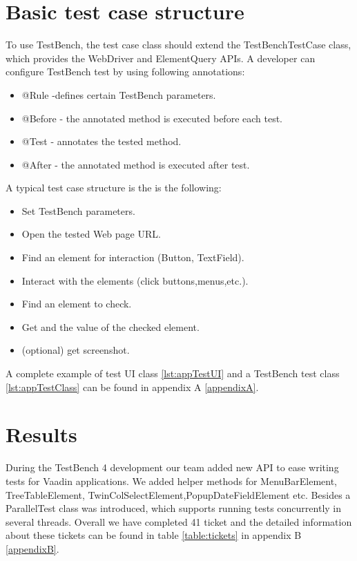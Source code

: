 \section {Basic test case structure}
To use TestBench, the test case class should extend the TestBenchTestCase class,
which provides the WebDriver and ElementQuery APIs. A developer
can configure TestBench test by using following annotations:
\begin{itemize}
  \item @Rule -defines certain TestBench parameters.
  \item @Before - the annotated method is executed before each test.
  \item @Test - annotates the tested method.
  \item @After - the annotated method is executed after test.
\end{itemize}

A typical test case structure is the is the following:
\begin{itemize}
  \item Set TestBench parameters.
  \item Open the tested Web page URL.
  \item Find an element for interaction (Button, TextField).
  \item Interact with the elements (click buttons,menus,etc.).
  \item Find an element to check.
  \item Get and the value of the checked element.
  \item (optional) get screenshot.
\end{itemize}

A complete example of test UI class \ref{lst:appTestUI}  and a TestBench test
class \ref{lst:appTestClass} can be found in appendix A \ref{appendixA}.

\section {Results}
During the TestBench 4 development our team added new API to ease writing tests
for Vaadin applications. We added helper methods for MenuBarElement,
TreeTableElement, TwinColSelectElement,PopupDateFieldElement etc. Besides a
ParallelTest class was introduced, which supports running tests concurrently in
several threads. Overall we have completed 41 ticket
and the detailed information about these tickets can be found in table \ref{table:tickets} in appendix B \ref{appendixB}.

